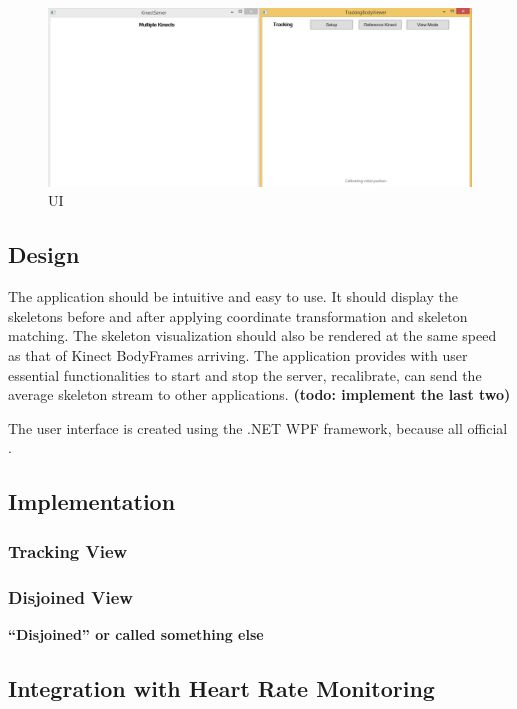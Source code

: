\documentclass{sigchi}
\begin{document}
\begin{figure}[!h]
  \centering
  \includegraphics[width=0.9\columnwidth]{ui}
  \caption{UI}
  \label{fig:ui}
\end{figure}

\subsection{Design}

The application should be intuitive and easy to use. It should display the skeletons before and after applying coordinate transformation and skeleton matching. The skeleton visualization should also be rendered at the same speed as that of Kinect BodyFrames arriving. The application provides with user essential functionalities to start and stop the server, recalibrate, can send the average skeleton stream to other applications. \textbf{(todo: implement the last two)}  

The user interface is created using the .NET WPF framework, because all official .

\subsection{Implementation}



\subsubsection{Tracking View}

\subsubsection{Disjoined View}

\textbf{``Disjoined'' or called something else}

\subsection{Integration with Heart Rate Monitoring}
\end{document}
